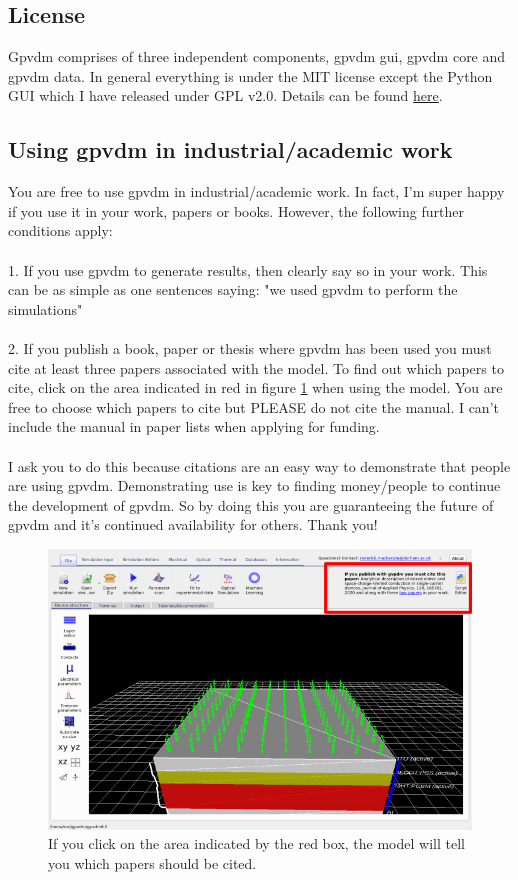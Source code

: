 \pagebreak
\subsection{License}
Gpvdm comprises of three independent components, gpvdm gui, gpvdm core and gpvdm data.  In general everything is under the MIT license except the Python GUI which I have released under GPL v2.0. Details can be found \href{https://github.com/roderickmackenzie/gpvdm/blob/main/LICENSE.md}{here}.

\subsection{Using gpvdm in industrial/academic work}
\label{sec:using_gvpdm}
You are free to use gpvdm in industrial/academic work. In fact, I'm super happy if you use it in your work, papers or books. However, the following further conditions apply:\\\\
1. If you use gpvdm to generate results, then clearly say so in your work. This can be as simple as one sentences saying: "we used gpvdm to perform the simulations" \\\\
2. If you publish a book, paper or thesis where gpvdm has been used you must cite at least three papers associated with the model.  To find out which papers to cite, click on the area indicated in red in figure \ref{fig:cite_me} when using the model.   You are free to choose which papers to cite but PLEASE do not cite the manual. I can't include the manual in paper lists when applying for funding.\\
\\
I ask you to do this because citations are an easy way to demonstrate that people are using gpvdm. Demonstrating use is key to finding money/people to continue the development of gpvdm.  So by doing this you are guaranteeing the future of gpvdm and it's continued availability for others.  Thank you!

\begin{figure}[ht!]
\centering
\includegraphics[width=\textwidth]{./images/cite_me2.png}
\caption{If you click on the area indicated by the red box, the model will tell you which papers should be cited.}
\label{fig:cite_me}
\end{figure}

